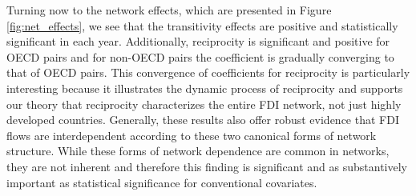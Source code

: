 \documentclass[reqno,onecolumn,letterpaper,12pt]{article}
\begin{document}
Turning now to the network effects, which are presented in Figure \ref{fig:net_effects}, we see that the transitivity effects are positive and statistically significant in each year. Additionally, reciprocity is significant and positive for OECD pairs and for non-OECD pairs the coefficient is gradually converging to that of OECD pairs. This convergence of coefficients for reciprocity is particularly interesting because it illustrates the dynamic process of reciprocity and supports our theory that reciprocity characterizes the entire FDI network, not just highly developed countries. Generally, these results also offer robust evidence that FDI flows are interdependent according to these two canonical forms of network structure. While these forms of network dependence are common in networks, they are not inherent and therefore this finding is significant and as substantively important as statistical significance for conventional covariates.
\end{document}
